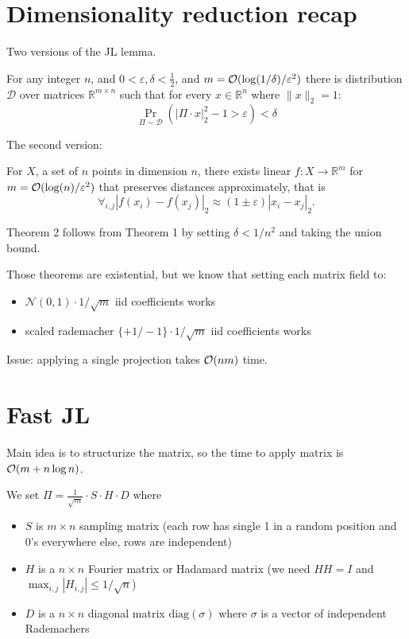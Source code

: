 \documentclass[11pt]{article}
\newcommand{\eps}{\varepsilon}
\begin{document}

\section{Dimensionality reduction recap}
Two versions of the JL lemma.
\begin{theorem}[Distributional JL]
For any integer $n$, and $0 < \varepsilon, \delta < \frac12$, and $m = \bigo(\log(1/\delta) / \eps^2)$ there is distribution $\mathcal{D}$ over matrices $\mathbb{R}^{m \times n}$ such that for every $x \in \mathbb{R}^n$ where $\|x\|_2 = 1$:
$$\Pr_{\Pi \sim \mathcal{D}} ( | \Pi \cdot x |_2^2 - 1  > \eps) < \delta $$
\end{theorem}
The second version:
\begin{theorem}[Metric JL]
For $X$, a set of $n$ points in dimension $n$, there exists linear $f : X \to \mathbb{R}^m$ for $m = \bigo(\log(n) / \eps^2)$ that preserves distances approximately, that is
$$\forall_{i,j}  |f(x_i) - f(x_j)|_2 \approx (1\pm\eps) |x_i - x_j|_2.$$
\end{theorem}

Theorem 2 follows from Theorem 1 by setting $\delta < 1/n^2$ and taking the union bound.


Those theorems are existential, but we know that  setting each matrix field to:
\begin{itemize}
\item $\mathcal{N}(0,1) \cdot 1/\sqrt{m}$ iid coefficients works
\item scaled rademacher $\{+1/-1\}   \cdot 1/\sqrt{m}$ iid coefficients works
\end{itemize}

Issue: applying a single projection takes $\mathcal{O}(nm)$ time.

\section{Fast JL \cite{DBLP:journals/siamcomp/AilonC09}}

Main idea is to structurize the matrix, so the time to apply matrix is $\mathcal{O}(m+n \log n)$.

We set $\Pi = \frac{1}{\sqrt{m}}  \cdot S \cdot H \cdot D$ where
\begin{itemize}
\item $S$ is $m \times n$ sampling matrix (each row has single 1 in a random position and 0's everywhere else, rows are independent)
\item $H$ is a $n \times n$ Fourier matrix or Hadamard matrix (we need $H H = I$ and $\max_{i,j} |H_{i,j}| \le 1/\sqrt{n} $)
\item $D$ is a $n \times n$ diagonal matrix $\textrm{diag}(\sigma)$ where $\sigma$ is a vector of independent Rademachers
\end{itemize}
\end{document}
